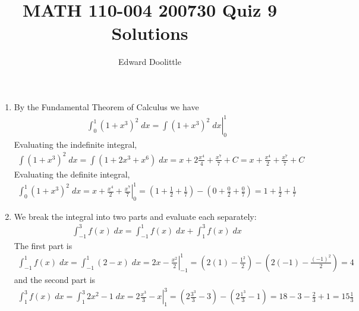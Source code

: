 \documentclass[12pt]{article}
\title{MATH 110-004 200730 Quiz 9 Solutions}
\author{Edward Doolittle}
\begin{document}
\maketitle

\begin{enumerate}
\item By the Fundamental Theorem of Calculus we have
  \begin{align*}
    \int_0^1 (1+x^3)^2 \; dx
    = \left. \int (1+x^3)^2 \; dx \right|_0^1
  \end{align*}
  Evaluating the indefinite integral,
  \begin{align*}
    \int (1+x^3)^2 \; dx
    = \int (1+2x^3+x^6) \; dx
    = x + 2\frac{x^4}{4} + \frac{x^7}{7} + C
    = x + \frac{x^4}{2} + \frac{x^7}{7} + C
  \end{align*}
  Evaluating the definite integral,
  \begin{align*}
    \int_0^1 (1+x^3)^2 \; dx
    = \left. x + \frac{x^4}{2} + \frac{x^7}{7} \right|_0^1
    = \left(1 + \frac{1}{2} + \frac{1}{7}\right) 
    - \left(0 + \frac{0}{2} + \frac{0}{7}\right)
    = 1 + \frac{1}{2} + \frac{1}{7}
  \end{align*}
\item We break the integral into two parts and evaluate each separately:
  \begin{align*}
    \int_{-1}^3 f(x) \; dx 
    = \int_{-1}^1 f(x) \; dx + \int_1^3 f(x) \; dx
  \end{align*}
  The first part is 
  \begin{align*}
    \int_{-1}^1 f(x) \; dx
    = \int_{-1}^1 (2-x) \; dx
    = \left. 2x-\frac{x^2}{2} \right|_{-1}^1
    = \left( 2(1)-\frac{1^2}{2}\right)
    - \left( 2(-1)-\frac{(-1)^2}{2}\right)
    = 4
  \end{align*}
  and the second part is
  \begin{align*}
    \int_1^3 f(x) \; dx
    = \int_1^3 2x^2-1 \; dx
    = \left. 2\frac{x^3}{3} - x \right|_1^3
    = \left( 2\frac{3^3}{3} - 3 \right)
    - \left( 2\frac{1^3}{3} - 1 \right)
    = 18 - 3 - \frac{2}{3} + 1
    = 15 \frac{1}{3}
  \end{align*}
\end{enumerate}
\end{document}
